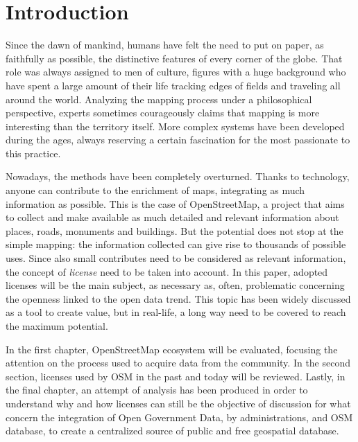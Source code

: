 \section*{Introduction}
Since the dawn of mankind, humans have felt the need to put on paper, as faithfully as possible, the distinctive features of every corner of the globe. That role was always assigned to men of culture, figures with a huge background who have spent a large amount of their life tracking edges of fields and traveling all around the world.
Analyzing the mapping process under a philosophical perspective, experts sometimes courageously claims that mapping is more interesting than the territory itself\cite{caquard2013cartographyI}.
More complex systems have been developed during the ages, always reserving a certain fascination for the most passionate to this practice.

Nowadays, the methods have been completely overturned. Thanks to technology, anyone can contribute to the enrichment of maps, integrating as much information as possible. This is the case of OpenStreetMap, a project that aims to collect and make available as much detailed and relevant information about places, roads, monuments and buildings.
But the potential does not stop at the simple mapping: the information collected can give rise to thousands of possible uses.
Since also small contributes need to be considered as relevant information, the concept of \textit{license} need to be taken into account.
In this paper, adopted licenses will be the main subject, as necessary as, often, problematic concerning the openness linked to the open data trend. This topic has been widely discussed as a tool to create value, but in real-life, a long way need to be covered to reach the maximum potential.

In the first chapter, OpenStreetMap ecosystem will be evaluated, focusing the attention on the process used to acquire data from the community. In the second section, licenses used by OSM in the past and today will be reviewed. Lastly, in the final chapter, an attempt of analysis has been produced in order to understand why and how licenses can still be the objective of discussion for what concern the integration of Open Government Data, by administrations, and OSM database, to create a centralized source of public and free geospatial database.